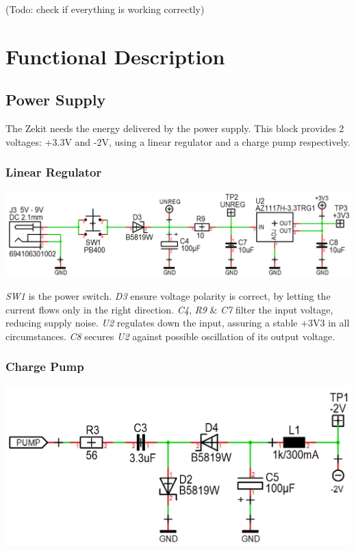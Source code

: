 \documentclass{scrartcl}
\begin{document}
(Todo: check if everything is working correctly)

\pagebreak


\section{Functional Description}

\subsection{Power Supply}

The Zekit needs the energy delivered by the power supply. This block provides 2 voltages: +3.3V and -2V, using a linear regulator and a charge pump respectively.

\subsubsection{Linear Regulator}

\begin{center}
    \includegraphics[scale=0.4]{assets/schema-power.png}
\end{center}

\emph{SW1} is the power switch. \emph{D3} ensure voltage polarity is correct, by letting the current flows only in the right direction. \emph{C4}, \emph{R9} \& \emph{C7} filter the input voltage, reducing supply noise. \emph{U2} regulates down the input, assuring a stable +3V3 in all circumstances. \emph{C8} secures \emph{U2} against possible oscillation of its output voltage.

\subsubsection{Charge Pump}

\begin{center}
    \includegraphics[scale=0.3]{assets/schema-pump.png}
\end{center}
\end{document}
